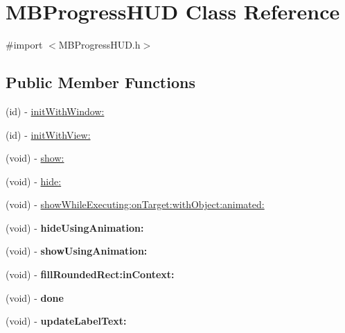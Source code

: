 \hypertarget{interface_m_b_progress_h_u_d}{
\section{MBProgressHUD Class Reference}
\label{interface_m_b_progress_h_u_d}
}


{\ttfamily \#import $<$MBProgressHUD.h$>$}

\subsection*{Public Member Functions}
\begin{DoxyCompactItemize}
\item 
(id) -\/ \hyperlink{interface_m_b_progress_h_u_d_a8f3c01167d59153c85ae7efdca7717fc}{initWithWindow:}
\item 
(id) -\/ \hyperlink{interface_m_b_progress_h_u_d_ae42ee0d2d0ea58fac1ce8de6b5ea3b60}{initWithView:}
\item 
(void) -\/ \hyperlink{interface_m_b_progress_h_u_d_a3ef075a3be624c2f94629d63bfeae25b}{show:}
\item 
(void) -\/ \hyperlink{interface_m_b_progress_h_u_d_a500fd79859e56cf98fd2eebfd37b4204}{hide:}
\item 
(void) -\/ \hyperlink{interface_m_b_progress_h_u_d_a23cd23b9c46bd819f14314426ed9dcdb}{showWhileExecuting:onTarget:withObject:animated:}
\item 
\hypertarget{interface_m_b_progress_h_u_d_aa3a0b42eeeb2df228793b32806af1883}{
(void) -\/ {\bfseries hideUsingAnimation:}}
\label{interface_m_b_progress_h_u_d_aa3a0b42eeeb2df228793b32806af1883}

\item 
\hypertarget{interface_m_b_progress_h_u_d_a1d81696b9e99cce3e4291c7a5e7ca13f}{
(void) -\/ {\bfseries showUsingAnimation:}}
\label{interface_m_b_progress_h_u_d_a1d81696b9e99cce3e4291c7a5e7ca13f}

\item 
\hypertarget{interface_m_b_progress_h_u_d_aab300ee4bb192452d29d111856f89cfa}{
(void) -\/ {\bfseries fillRoundedRect:inContext:}}
\label{interface_m_b_progress_h_u_d_aab300ee4bb192452d29d111856f89cfa}

\item 
\hypertarget{interface_m_b_progress_h_u_d_ac2a1bbca15d4c98346db20c155252e1f}{
(void) -\/ {\bfseries done}}
\label{interface_m_b_progress_h_u_d_ac2a1bbca15d4c98346db20c155252e1f}

\item 
\hypertarget{interface_m_b_progress_h_u_d_af2058ea5753426dc853f70bad47a7b99}{
(void) -\/ {\bfseries updateLabelText:}}
\label{interface_m_b_progress_h_u_d_af2058ea5753426dc853f70bad47a7b99}


\end{DoxyCompactItemize}

